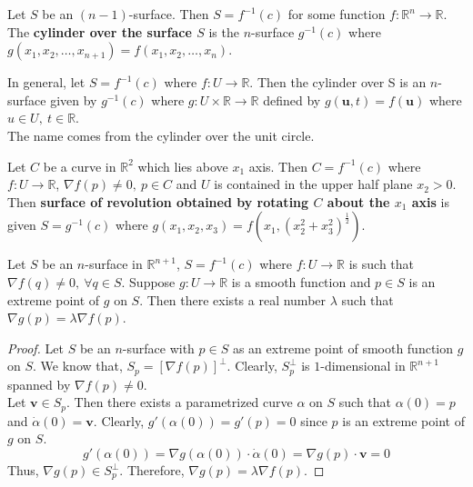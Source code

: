 \begin{definition}
	Let $S$ be an $(n-1)$-surface.
	Then $S = f^{-1}(c)$ for some function $f : \mathbb{R}^n \to \mathbb{R}$.
	The \textbf{cylinder over the surface $S$} is the $n$-surface $g^{-1}(c)$ where $g(x_1,x_2,\dots,x_{n+1}) = f(x_1,x_2,\dots,x_n)$.
\end{definition}

\begin{commentary}
	In general, let $S = f^{-1}(c)$ where $f : U \to \mathbb{R}$. Then the cylinder over S is an $n$-surface given by $g^{-1}(c)$ where $g : U \times \mathbb{R} \to \mathbb{R}$ defined by $g(\boldsymbol{u},t) = f(\boldsymbol{u})$ where $u \in U,\ t \in \mathbb{R}$.\\
	
	The name comes from the cylinder over the unit circle.
\end{commentary}

\begin{definition}
	Let $C$ be a curve in $\mathbb{R}^2$ which lies above $x_1$ axis. Then $C = f^{-1}(c)$ where $f : U \to \mathbb{R}$, $\nabla f(p) \ne 0,\ p \in C$ and $U$ is contained in the upper half plane $x_2 > 0$.
	Then \textbf{surface of revolution obtained by rotating $C$ about the $x_1$ axis} is given $S = g^{-1}(c)$ where $g(x_1,x_2,x_3) = f(x_1,(x_2^2+x_3^2)^\frac{1}{2})$.
\end{definition}

\begin{theorem}
	Let $S$ be an $n$-surface in $\mathbb{R}^{n+1}$, $S = f^{-1}(c)$ where $f : U \to \mathbb{R}$ is such that $\nabla f(q) \ne 0,\ \forall q \in S$. Suppose $g : U \to \mathbb{R}$ is a smooth function and $p \in S$ is an extreme point of $g$ on $S$. Then there exists a real number $\lambda$ such that $\nabla g(p) = \lambda \nabla f(p)$.
\end{theorem}
\begin{proof}
	Let $S$ be an $n$-surface with $p \in S$ as an extreme point of smooth function $g$ on $S$.
	We know that, $S_p = [\nabla f(p)]^\perp$.
	Clearly, $S_p^\perp$ is $1$-dimensional in $\mathbb{R}^{n+1}$ spanned by $\nabla f(p) \ne 0$.\\

	Let $\boldsymbol{v} \in S_p$. Then there exists a parametrized curve $\alpha$ on $S$ such that $\alpha(0) = p$ and $\dot\alpha(0) = \boldsymbol{v}$.
	Clearly, $g'(\alpha(0)) = g'(p) = 0$ since $p$ is an extreme point of $g$ on $S$.
	$$ g'(\alpha(0)) = \nabla g(\alpha(0)) \cdot \dot\alpha(0) = \nabla g(p) \cdot \boldsymbol{v} = 0 $$
	Thus, $\nabla g(p) \in S_p^\perp$.
	Therefore, $\nabla g(p) = \lambda \nabla f(p)$.
\end{proof}

